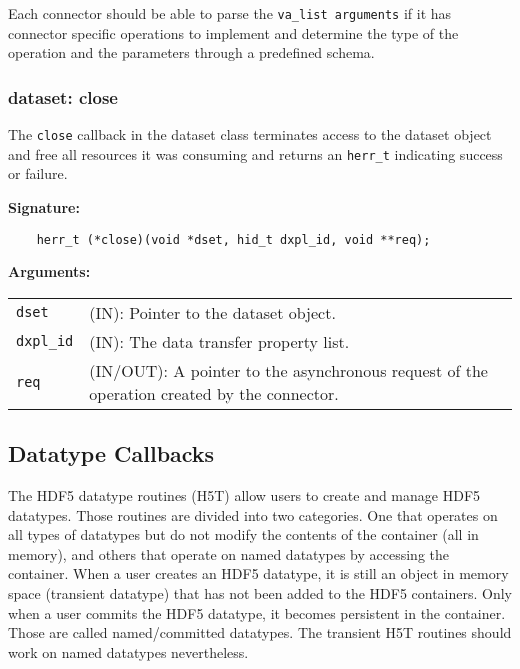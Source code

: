 Each connector should be able to parse the \texttt{va\_list arguments} if it has connector specific operations to implement and determine the type of the operation and the parameters through a predefined schema. 

\subsubsection{dataset: close}
The \texttt{close} callback in the dataset class terminates access
to the dataset object and free all resources it was consuming and
returns an \texttt{herr\_t} indicating success or failure.\bigskip

\begin{mdframed}[style=bgbox]
\textbf{Signature:}
\begin{lstlisting}
    herr_t (*close)(void *dset, hid_t dxpl_id, void **req);
\end{lstlisting}

\textbf{Arguments:}\\
\begin{tabular}{l p{13.5cm}}
  \texttt{dset} & (IN): Pointer to the dataset object.\\
  \texttt{dxpl\_id} & (IN): The data transfer property list.\\
  \texttt{req} & (IN/OUT): A pointer to the asynchronous request of the
  operation created by the connector.\\
\end{tabular}
\end{mdframed}


\subsection{Datatype Callbacks}
The HDF5 datatype routines (H5T) allow users to create and manage HDF5
datatypes. Those routines are divided into two categories. One that
operates on all types of datatypes but do not modify the contents of
the container (all in memory), and others that operate on named
datatypes by accessing the container. When a user creates an HDF5
datatype, it is still an object in memory space (transient datatype)
that has not been added to the HDF5 containers. Only when a user
commits the HDF5 datatype, it becomes persistent in the
container. Those are called named/committed datatypes. The transient
H5T routines should work on named datatypes nevertheless. 

